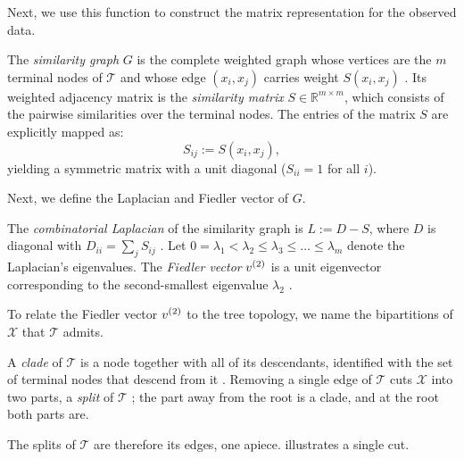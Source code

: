 Next, we use this function to construct the matrix representation for the observed data.

\begin{definition}\label{def:simgraph}
The \emph{similarity graph} $G$ is the complete weighted graph whose vertices are the $m$ terminal nodes of $\mathcal{T}$ and whose edge $(x_i,x_j)$ carries weight $S(x_i,x_j)$ \cite{aizenbud2023spectral}. Its weighted adjacency matrix is the \emph{similarity matrix} $S \in \mathbb{R}^{m \times m}$, which consists of the pairwise similarities over the terminal nodes. The entries of the matrix $S$ are explicitly mapped as:
\begin{equation}
    S_{ij} := S(x_i, x_j),
\end{equation}
yielding a symmetric matrix with a unit diagonal ($S_{ii}=1$ for all $i$).
\end{definition}

Next, we define the Laplacian and Fiedler vector of $G$.

\begin{definition}\label{def:fiedler}
The \emph{combinatorial Laplacian} of the similarity graph is $L := D - S$, where $D$ is diagonal
with $D_{ii} = \sum_j S_{ij}$ \cite{aizenbud2023spectral}. Let 
$0 = \lambda_1 < \lambda_2 \le \lambda_3 \le \dots \le \lambda_m$ denote the Laplacian's eigenvalues. The
\emph{Fiedler vector} $v^{(2)}$ is a unit eigenvector corresponding to the second-smallest eigenvalue
$\lambda_2$ \cite{fiedler1975property, vonluxburg2007tutorial}.
\end{definition}



To relate the Fiedler vector $v^{(2)}$ to the tree topology, we name the bipartitions of
$\mathcal{X}$ that $\mathcal{T}$ admits.

\begin{definition}\label{def:clade}
A \emph{clade} of $\mathcal{T}$ is a node together with all of its descendants, identified with
the set of terminal nodes that descend from it \cite{wilkinson2007clades}. Removing a single
edge of $\mathcal{T}$ cuts $\mathcal{X}$ into two parts, a \emph{split} of $\mathcal{T}$
\cite{aizenbud2023spectral}; the part away from the root is a clade, and at the root both parts
are.
\end{definition}

\noindent The splits of $\mathcal{T}$ are therefore its edges, one apiece.
 illustrates a single cut.


